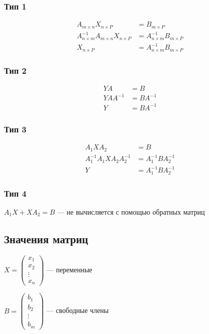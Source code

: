 \documentclass{article}
\begin{document}
\subsubsection*{Тип 1}

\begin{align*}
A_{m \times n} X_{n \times P} &= B_{m \times P}\\
A_{n \times m}^{-1} A_{m \times n} X_{n \times P} &= A_{n \times m}^{-1} B_{m \times P}\\
X_{n \times P} &= A_{n \times m}^{-1} B_{m \times P}
\end{align*}

\subsubsection*{Тип 2}

\begin{align*}
Y A &= B \\
Y A A^{-1} &= B A^{-1} \\
Y &= B A^{-1}
\end{align*}

\subsubsection*{Тип 3}

\begin{align*}
	A_1 X A_2 &= B \\
	A_1^{-1} A_1 X A_2 A_2^{-1} &= A_1^{-1} B A_2^{-1} \\
	Y &= A_1^{-1} B A_2^{-1}
\end{align*}	

\subsubsection*{Тип 4}

$A_1 X + X A_2 = B$ --- не вычисляется с помощью обратных матриц

\subsection{Значения матриц}

$
X = \begin{pmatrix}
	x_1 \\
	x_2 \\
	\vdots \\
	x_n
\end{pmatrix}
$ --- переменные

$B = \begin{pmatrix}
	b_1 \\
	b_2 \\
	\vdots \\
	b_m
\end{pmatrix}$ --- свободные члены
\end{document}
